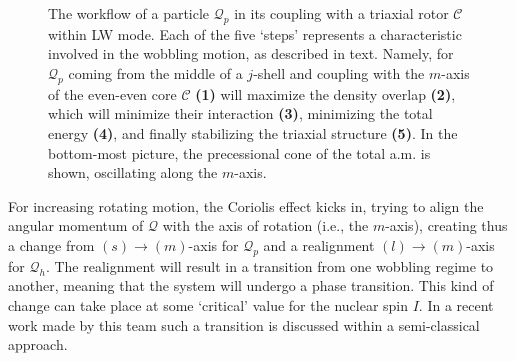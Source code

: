 \begin{figure}
\begin{tikzpicture}[every text node part/.style={align=center}]
    \end{tikzpicture}
    
    \caption{The workflow of a particle $\mathcal{Q}_p$ in its coupling with a triaxial rotor $\mathscr{C}$ within LW mode. Each of the five `steps' represents a characteristic involved in the wobbling motion, as described in text. Namely, for $\mathcal{Q}_p$ coming from the middle of a $j$-shell and coupling with the $m$-axis of the even-even core $\mathscr{C}$ \textbf{(1)} will maximize the density overlap \textbf{(2)}, which will minimize their interaction \textbf{(3)}, minimizing the total energy \textbf{(4)}, and finally stabilizing the triaxial structure \textbf{(5)}. In the bottom-most picture, the precessional cone of the total a.m. is shown, oscillating along the $m$-axis.}
    \label{advanced-quasiparticle-coupling-3}
\end{figure}

For increasing rotating motion, the Coriolis effect kicks in, trying to align the angular momentum of $\mathcal{Q}$ with the axis of rotation (i.e., the $m$-axis), creating thus a change from $(s)\to (m)$-axis for $\mathcal{Q}_p$ and a realignment $(l) \to (m)$-axis for $\mathcal{Q}_h$. The realignment will result in a transition from one wobbling regime to another, meaning that the system will undergo a phase transition. This kind of change can take place at some `critical' value for the nuclear spin $I$. In a recent work made by this team \cite{poenaru2021extensive1,poenaru2021extensive2} such a transition is discussed within a semi-classical approach.

